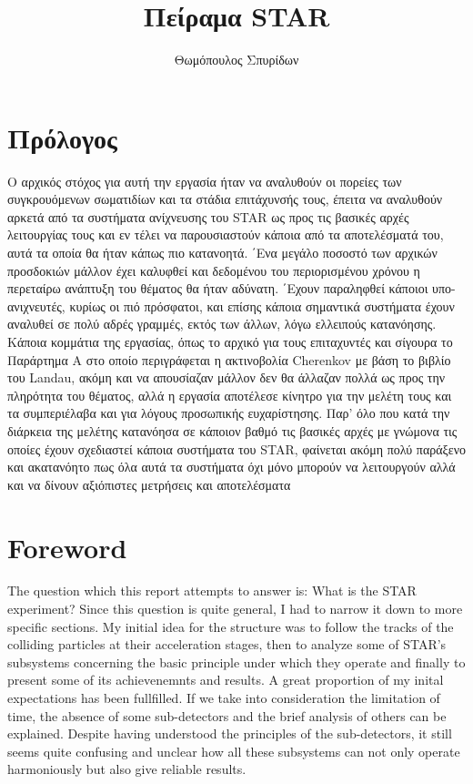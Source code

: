 \documentclass[a4paper,11pt]{book}
\title{Πείραμα 	STAR}
\author{Θωμόπουλος Σπυρίδων}
\begin{document}


\begin{changemargin}{2cm}{2cm} 
	\section*{Πρόλογος}
Ο αρχικός στόχος για αυτή την εργασία ήταν να αναλυθούν οι πορείες
των συγκρουόμενων σωματιδίων και τα στάδια επιτάχυνσής τους, έπειτα
να αναλυθούν αρκετά από τα συστήματα ανίχνευσης του STAR ως προς
τις βασικές αρχές λειτουργίας τους και εν τέλει να παρουσιαστούν κάποια
από τα αποτελέσματά του, αυτά τα οποία θα ήταν κάπως πιο κατανοητά.
΄Ενα μεγάλο ποσοστό των αρχικών προσδοκιών μάλλον έχει καλυφθεί και
δεδομένου του περιορισμένου χρόνου η περεταίρω ανάπτυξη του θέματος
θα ήταν αδύνατη. ΄Εχουν παραληφθεί κάποιοι υπο-ανιχνευτές, κυρίως οι
πιό πρόσφατοι, και επίσης κάποια σημαντικά συστήματα έχουν αναλυθεί
σε πολύ αδρές γραμμές, εκτός των άλλων, λόγω ελλειπούς κατανόησης.
Κάποια κομμάτια της εργασίας, όπως το αρχικό για τους επιταχυντές και
σίγουρα το Παράρτημα Α στο οποίο περιγράφεται η ακτινοβολία Cherenkov
με βάση το βιβλίο του Landau, ακόμη και να απουσίαζαν μάλλον δεν θα
άλλαζαν πολλά ως προς την πληρότητα του θέματος, αλλά η εργασία
αποτέλεσε κίνητρο για την μελέτη τους και τα συμπεριέλαβα και για λόγους προσωπικής ευχαρίστησης.
Παρ’ όλο που κατά την διάρκεια της μελέτης κατανόησα σε κάποιον βαθμό
τις βασικές αρχές με γνώμονα τις οποίες έχουν σχεδιαστεί κάποια συστήματα του STAR, φαίνεται ακόμη πολύ παράξενο και ακατανόητο πως όλα
αυτά τα συστήματα όχι μόνο μπορούν να λειτουργούν αλλά και να δίνουν
αξιόπιστες μετρήσεις και αποτελέσματα

\section*{Foreword}
The question which this report attempts to answer is: What is the STAR experiment? Since this question is quite general, I had to narrow it down to more specific sections. My initial idea for the structure was to follow the tracks of the colliding particles at their acceleration stages, then to analyze some of STAR's subsystems concerning the basic principle under which they operate and finally to present some of its achievenemnts and results. 
	A great proportion of my inital expectations has been fullfilled. If we take into consideration the limitation of time, the absence of some sub-detectors and the brief analysis of others can be explained.
	 Despite having understood the principles of the sub-detectors, it still seems quite confusing and unclear how all these subsystems can not only operate harmoniously but also give reliable results. 
\end{changemargin} 
\end{document}
